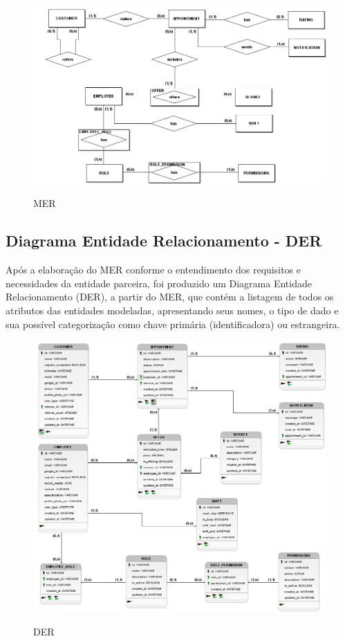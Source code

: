 \begin{figure}[h!tbp]
	\centering
	\caption{MER}
	\includegraphics[width=1\textwidth]{cap04-desenvolvimento/images/4-7-1-modelo-entidade-relacionamento.png}
	\label{fig:mer}
\end{figure}
\subsection{Diagrama Entidade Relacionamento - DER}
Após a elaboração do MER conforme o entendimento dos requisitos e necessidades da entidade parceira, foi produzido um Diagrama Entidade Relacionamento (DER), a partir do MER, que contém a listagem de todos os atributos das entidades modeladas, apresentando seus nomes, o tipo de dado e sua possível categorização como chave primária (identificadora) ou estrangeira.
\begin{figure}[h!tbp]
	\centering
	\caption{DER}
	\includegraphics[width=1\textwidth]{cap04-desenvolvimento/images/4-7-2-diagrama-entidade-relacionamento.png}
	\label{fig:der}
\end{figure}
